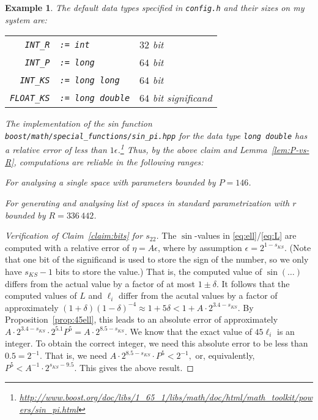 \documentclass{article}
\newtheorem{eg}[thm]{Example}
\newcommand{\macheps}{\epsilon} %
\begin{document}
\begin{eg}
  The default data types specified in \verb+config.h+ and their sizes on my system are:
  \begin{center}
    \begin{tabular}{rp{10em}l}
      \verb+INT_R+ & \texttt{:= int} & \(32\) bit \\
      \verb+INT_P+ & \texttt{:= long} &  \(64\) bit \\
      \verb+INT_KS+ & \texttt{:= long long} & \(64\) bit \\
      \verb+FLOAT_KS+ & \texttt{:= long double} & \(64\) bit significand
    \end{tabular}
  \end{center}
  The implementation of the sin function \verb+boost/math/special_functions/sin_pi.hpp+
  for the data type \texttt{long double} has a relative error of less than \(1\macheps\).\footnote{%
    \url{http://www.boost.org/doc/libs/1_65_1/libs/math/doc/html/math_toolkit/powers/sin_pi.html}}
  Thus, by the above claim and Lemma~\ref{lem:P-vs-R}, computations are reliable in the following ranges:
  \begin{compactitem}
  \item For analysing a single space with parameters bounded by \(P=146\).
  \item For generating and analysing list of spaces in standard parametrization with \(r\) bounded by \(R=336\,442\).
  \end{compactitem}
\end{eg}

\begin{proof}[Verification of Claim~\ref{claim:bits} for \(s_{22}\)]
  The \(\sin\)-values in \eqref{eq:ell}\slash\eqref{eq:L} are computed with a relative error of \(\eta = A\macheps\), where by assumption \(\macheps=2^{1-s_{KS}}\).  (Note that one bit of the significand is used to store the sign of the number, so we only have \(s_{KS}-1\) bits to store the value.) That is, the computed value of \(\sin(\dots)\) differs from the actual value by a factor of at most \(1\pm \delta\).  It follows that the computed values of \(L\) and \(\ell_i\) differ from the acutal values by a factor of approximately \((1+\delta)(1-\delta)^{-4} \approx 1 + 5\delta < 1+A·2^{3.4-s_{KS}}\).  By Proposition~\ref{prop:45ell}, this leads to an absolute error of approximately \(A·2^{3.4-s_{KS}}·2^{5.1}P^5 = A·2^{8.5-s_{KS}}\).  We know that the exact value of \(45\ell_i\) is an integer.  To obtain the correct integer, we need this absolute error to be less than \(0.5 = 2^{-1}\).  That is, we need
  \(
    A·2^{8.5-s_{KS}}·P^5 < 2^{-1},
  \)
  or, equivalently,
  \(
    P^5 < A^{-1}·2^{s_{KS}-9.5}.
  \)
  This gives the above result.
  \end{proof}
\end{document}
